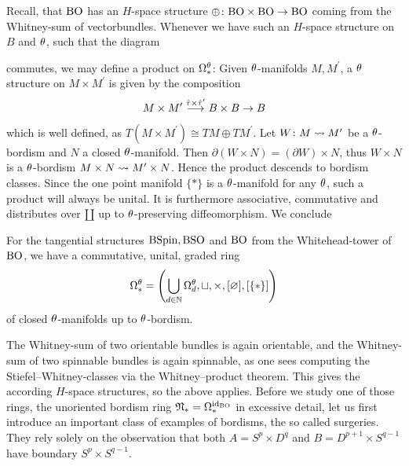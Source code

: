 Recall, that $\mathrm{BO}$ has an $H$-space structure $\oplus\colon\mathrm{BO} \times \mathrm{BO} \to \mathrm{BO}$ coming from the Whitney-sum of vectorbundles. 
Whenever we have such an $H$-space structure on $B$ and $\theta$, such that the diagram
\begin{center}
\end{center}
commutes, we may define a product on $\Omega_\ast^\theta$:
Given $\theta$-manifolds $M,M^\prime$, a $\theta$ structure on $M\times M^\prime$ is given by the composition 
\begin{equation*}
    M\times M^\prime \overset{\hat{\tau} \times \hat{\tau}^\prime}{\longrightarrow} B\times B \to B
\end{equation*}
which is well defined, as $T(M\times M^\prime) \cong TM\oplus TM^\prime$.
Let $W\colon M\rightsquigarrow M^\prime$ be a $\theta$-bordism and $N$ a closed $\theta$-manifold.
Then $\partial (W\times N) = (\partial W)\times N$, thus $W\times N$ is a $\theta$-bordism $M\times N\rightsquigarrow M^\prime\times N$.
Hence the product descends to bordism classes.
Since the one point manifold $\{\ast\}$ is a $\theta$-manifold for any $\theta$, such a product will always be unital.
It is furthermore associative, commutative and distributes over $\amalg$ up to $\theta$-preserving diffeomorphism.
We conclude
\begin{thesisprop}
    For the tangential structures $\mathrm{BSpin},\mathrm{BSO}$ and $\mathrm{BO}$ from the Whitehead-tower of $\mathrm{BO}$, we have a commutative, unital, graded ring
    \begin{equation*}
        \Omega_\ast^\theta = \left( \bigcup_{d\in\mathbb{N}} \Omega_d^\theta, \sqcup, \times , [\varnothing], [\{\ast\}] \right)
    \end{equation*}
    of closed $\theta$-manifolds up to $\theta$-bordism.
\end{thesisprop}
\prf
The Whitney-sum of two orientable bundles is again orientable, and the Whitney-sum of two spinnable bundles is again spinnable, as one sees computing the Stiefel--Whitney-classes via the Whitney--product theorem.
This gives the according $H$-space structures, so the above applies.
\endprf
Before we study one of those rings, the unoriented bordism ring $\mathfrak{N}_\ast = \Omega_\ast^{\operatorname{id}_{\mathrm{BO}}}$ in excessive detail, let us first introduce an important class of examples of bordisms, the so called surgeries.
They rely solely on the observation that both $A = S^p\times D^q$ and $B = D^{p+1}\times S^{q-1}$ have boundary $S^p\times S^{q-1}$.
